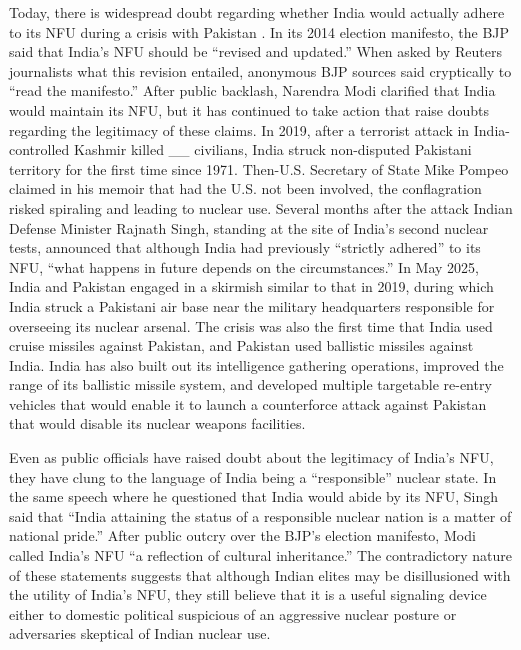 \documentclass[12pt]{article}
\begin{document}
Today, there is widespread doubt regarding whether India would actually adhere to its NFU during a crisis with Pakistan \citep{clary_indias_2019}. In its 2014 election manifesto, the BJP said that India's NFU should be “revised and updated.” When asked by Reuters journalists what this revision entailed, anonymous BJP sources said cryptically to “read the manifesto.” After public backlash, Narendra Modi clarified that India would maintain its NFU, but it has continued to take action that raise doubts regarding the legitimacy of these claims. In 2019, after a terrorist attack in India-controlled Kashmir killed \_\_ civilians, India struck non-disputed Pakistani territory for the first time since 1971. Then-U.S. Secretary of State Mike Pompeo claimed in his memoir that had the U.S. not been involved, the conflagration risked spiraling and leading to nuclear use. Several months after the attack Indian Defense Minister Rajnath Singh, standing at the site of India's second nuclear tests, announced that although India had previously “strictly adhered” to its NFU, “what happens in future depends on the circumstances.” In May 2025, India and Pakistan engaged in a skirmish similar to that in 2019, during which India struck a Pakistani air base near the military headquarters responsible for overseeing its nuclear arsenal. The crisis was also the first time that India used cruise missiles against Pakistan, and Pakistan used ballistic missiles against India. India has also built out its intelligence gathering operations, improved the range of its ballistic missile system, and developed multiple targetable re-entry vehicles that would enable it to launch a counterforce attack against Pakistan that would disable its nuclear weapons facilities.

Even as public officials have raised doubt about the legitimacy of India's NFU, they have clung to the language of India being a “responsible” nuclear state. In the same speech where he questioned that India would abide by its NFU, Singh said that “India attaining the status of a responsible nuclear nation is a matter of national pride.” After public outcry over the BJP's election manifesto, Modi called India's NFU “a reflection of cultural inheritance.” The contradictory nature of these statements suggests that although Indian elites may be disillusioned with the utility of India's NFU, they still believe that it is a useful signaling device either to domestic political suspicious of an aggressive nuclear posture or adversaries skeptical of Indian nuclear use.


\end{document}
